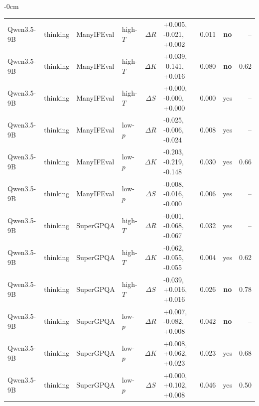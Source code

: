 \begin{table}[H]
\begin{adjustwidth}{-\extralength}{0cm}
\begin{tabular}{llllclccr}
Qwen3.5-9B & thinking & ManyIFEval & high-$T$ & $\Delta R$ & +0.005, -0.021, +0.002 & 0.011 & \textbf{no} & -- \tabularnewline
Qwen3.5-9B & thinking & ManyIFEval & high-$T$ & $\Delta K$ & +0.039, -0.141, +0.016 & 0.080 & \textbf{no} & 0.62 \tabularnewline
Qwen3.5-9B & thinking & ManyIFEval & high-$T$ & $\Delta S$ & +0.000, -0.000, +0.000 & 0.000 & yes & -- \tabularnewline
Qwen3.5-9B & thinking & ManyIFEval & low-$p$ & $\Delta R$ & -0.025, -0.006, -0.024 & 0.008 & yes & -- \tabularnewline
Qwen3.5-9B & thinking & ManyIFEval & low-$p$ & $\Delta K$ & -0.203, -0.219, -0.148 & 0.030 & yes & 0.66 \tabularnewline
Qwen3.5-9B & thinking & ManyIFEval & low-$p$ & $\Delta S$ & -0.008, -0.016, -0.000 & 0.006 & yes & -- \tabularnewline
Qwen3.5-9B & thinking & SuperGPQA & high-$T$ & $\Delta R$ & -0.001, -0.068, -0.067 & 0.032 & yes & -- \tabularnewline
Qwen3.5-9B & thinking & SuperGPQA & high-$T$ & $\Delta K$ & -0.062, -0.055, -0.055 & 0.004 & yes & 0.62 \tabularnewline
Qwen3.5-9B & thinking & SuperGPQA & high-$T$ & $\Delta S$ & -0.039, +0.016, +0.016 & 0.026 & \textbf{no} & 0.78 \tabularnewline
Qwen3.5-9B & thinking & SuperGPQA & low-$p$ & $\Delta R$ & +0.007, -0.082, +0.008 & 0.042 & \textbf{no} & -- \tabularnewline
Qwen3.5-9B & thinking & SuperGPQA & low-$p$ & $\Delta K$ & +0.008, +0.062, +0.023 & 0.023 & yes & 0.68 \tabularnewline
Qwen3.5-9B & thinking & SuperGPQA & low-$p$ & $\Delta S$ & +0.000, +0.102, +0.008 & 0.046 & yes & 0.50 \tabularnewline
\bottomrule
\end{tabular}
\end{adjustwidth}
\end{table}

